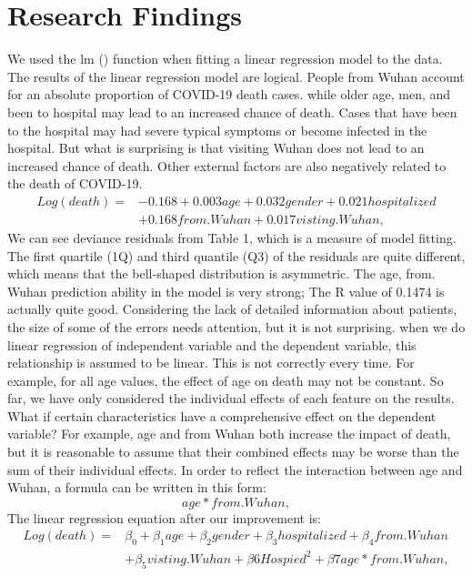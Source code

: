 \documentclass[12pt,english]{article}
\begin{document}
\newline
\section{Research Findings}
We used the lm () function when fitting a linear regression model to the data. The results of the linear regression model are logical. People from Wuhan account for an absolute proportion of COVID-19 death cases. while older age, men, and been to hospital  may lead to an increased chance of death. Cases that have been to the hospital may had severe typical symptoms or become infected in the hospital. But what is surprising is that visiting Wuhan does not lead to an increased chance of death. Other external factors are also negatively related to the death of COVID-19.
\begin{equation}
\begin{aligned}
\label{eq:1}
Log(death) =&-0.168 + 0.003 age+ 0.032 gender + 0.021 hospitalized\\&+0.168 from.Wuhan+ 0.017 visting.Wuhan,
\end{aligned}
\end{equation}
We can see deviance residuals from Table 1, which is a measure of model fitting. The first quartile (1Q) and third quantile (Q3) of the residuals are quite different, which means that the bell-shaped distribution is asymmetric.
The age, from. Wuhan prediction ability in the model is very strong;
The R value of 0.1474 is actually quite good. Considering the lack of detailed information about patients, the size of some of the errors needs attention, but it is not surprising.
\newline
when we do linear regression of independent variable and the dependent variable, this relationship is assumed to be linear. This is not correctly every time. For example, for all age values, the effect of age on death may not be constant. So far, we have only considered the individual effects of each feature on the results. What if certain characteristics have a comprehensive effect on the dependent variable? For example, age and from Wuhan both increase the impact of death, but it is reasonable to assume that their combined effects may be worse than the sum of their individual effects.
In order to reflect the interaction between age and Wuhan, a formula can be written in this form: 
\begin{equation}
\label{eq:1}
age * from.Wuhan,
\end{equation}
\newline
The linear regression equation after our improvement is:
\begin{equation}
\begin{aligned}
\label{eq:1}
Log(death) =&\beta_0 + \beta_1 age+\beta_2 gender + \beta_3 hospitalized+
\beta_4 from.Wuhan\\&+ \beta_5 visting.Wuhan+\beta6 Hospied^2+ \beta7 age * from.Wuhan,
\end{aligned}
\end{equation}
\end{document}
